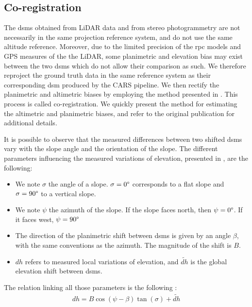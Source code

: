 \subsection{Co-registration}
The \acrshort{dsm}s obtained from LiDAR data and from stereo photogrammetry are not necessarily in the same projection reference system, and do not use the same altitude reference. Moreover, due to the limited precision of the \acrshort{rpc} models and GPS measures of the the LiDAR, some planimetric and elevation bias may exist between the two \acrshort{dsm}s which do not allow their comparison as such. We therefore reproject the ground truth data in the same reference system as their corresponding \acrshort{dsm} produced by the CARS pipeline. We then rectify the planimetric and altimetric biases by employing the method presented in \cite{nuth_co-registration_2011}. This process is called co-registration. We quickly present the method for estimating the altimetric and planimetric biases, and refer to the original publication for additional details.

It is possible to observe that the measured differences between two shifted \acrshort{dsm}s vary with the slope angle and the orientation of the slope. The different parameters influencing the measured variations of elevation, presented in , are the following:
\begin{itemize}
    \item We note $\sigma$ the angle of a slope. $\sigma=0\degree$ corresponds to a flat slope and $\sigma=90\degree$ to a vertical slope.
    \item We note $\psi$ the azimuth of the slope. If the slope faces north, then $\psi=0\degree$. If it faces west, $\psi=90\degree$ \etc
    \item The direction of the planimetric shift between \acrshort{dsm}s is given by an angle $\beta$, with the same conventions as the azimuth. The magnitude of the shift is $B$.
    \item $dh$ refers to measured local variations of elevation, and $\tilde{dh}$ is the global elevation shift between \acrshort{dsm}s.
\end{itemize}
The relation linking all those parameters is the following \cite{nuth_co-registration_2011}:
\begin{align}
    dh = B\cos(\psi-\beta)\tan(\sigma)+\tilde{dh}
\end{align}

